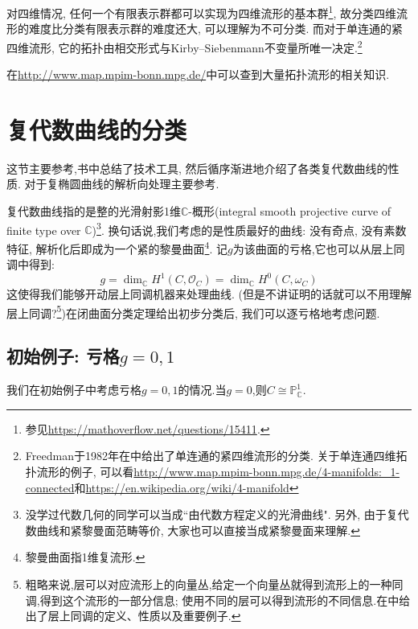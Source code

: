 \documentclass[UTF8,12pt,twoside]{article}
\theoremstyle{definition}
\newcommand{\CC}{\mathbb{C}}  %
\numberwithin{equation}{section}
\begin{document}
对四维情况, 任何一个有限表示群都可以实现为四维流形的基本群\footnote{参见\url{https://mathoverflow.net/questions/15411}.}, 故分类四维流形的难度比分类有限表示群的难度还大, 可以理解为不可分类. 而对于单连通的紧四维流形, 它的拓扑由相交形式与Kirby–Siebenmann不变量所唯一决定.\footnote{Freedman于1982年在\cite[Theorem 1.5]{freedman1982topology}中给出了单连通的紧四维流形的分类. 关于单连通四维拓扑流形的例子, 可以看\url{http://www.map.mpim-bonn.mpg.de/4-manifolds:_1-connected}和\url{https://en.wikipedia.org/wiki/4-manifold}}%

在\url{http://www.map.mpim-bonn.mpg.de/}中可以查到大量拓扑流形的相关知识.

\section{复代数曲线的分类}
这节主要参考\cite[Chapter 19]{vakil2017rising},书中总结了技术工具, 然后循序渐进地介绍了各类复代数曲线的性质. 对于复椭圆曲线的解析向处理主要参考\cite[第八章]{Li2019modularform}.

复代数曲线指的是整的光滑射影1维$\CC$-概形(integral smooth projective curve of finite type over $\CC$)\footnote{没学过代数几何的同学可以当成``由代数方程定义的光滑曲线". 另外, 由于复代数曲线和紧黎曼面范畴等价, 大家也可以直接当成紧黎曼面来理解.}. 换句话说,我们考虑的是性质最好的曲线: 没有奇点, 没有素数特征, 解析化后即成为一个紧的黎曼曲面\footnote{黎曼曲面指1维复流形.}. 记$g$为该曲面的亏格,它也可以从层上同调中得到: 
$$g=\dim_{\mathbb{C}}H^1(C,\mathcal{O}_C)=\dim_{\mathbb{C}}H^0(C,\omega_C)$$
这使得我们能够开动层上同调机器来处理曲线. (但是不讲证明的话就可以不用理解层上同调?\footnote{粗略来说,层可以对应流形上的向量丛,给定一个向量丛就得到流形上的一种同调,得到这个流形的一部分信息;      使用不同的层可以得到流形的不同信息.在\cite[Chapter 18]{vakil2017rising}中给出了层上同调的定义、性质以及重要例子.})在闭曲面分类定理给出初步分类后, 我们可以逐亏格地考虑问题.

\subsection{初始例子: 亏格$g=0,1$}
我们在初始例子中考虑亏格$g=0,1$的情况.当$g=0$,则$C \cong \mathbb{P}_{\CC}^1$.
\end{document}
